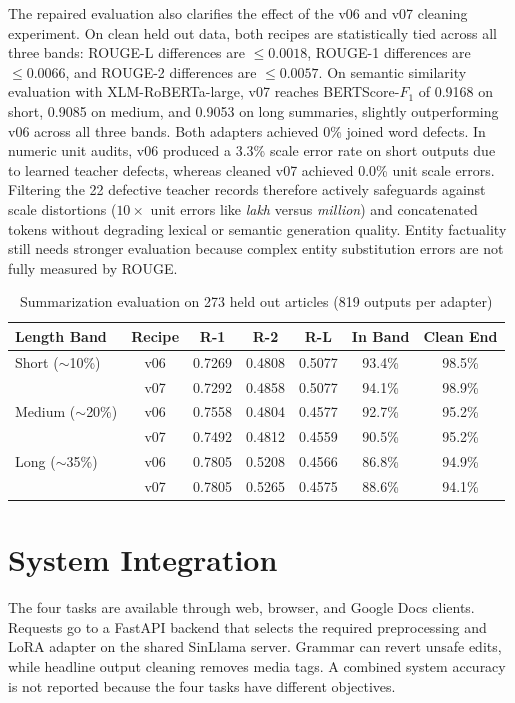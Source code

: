 \documentclass[a4paper,conference]{IEEEtran}
\begin{document}
The repaired evaluation also clarifies the effect of the v06 and v07 cleaning
experiment. On clean held out data, both recipes are statistically tied across all
three bands: ROUGE-L differences are $\le 0.0018$, ROUGE-1 differences are $\le 0.0066$,
and ROUGE-2 differences are $\le 0.0057$. On semantic similarity evaluation with
XLM-RoBERTa-large, v07 reaches BERTScore-$F_1$ of 0.9168 on short, 0.9085 on medium, and
0.9053 on long summaries, slightly outperforming v06 across all three bands. Both
adapters achieved 0\% joined word defects. In numeric unit audits, v06 produced a 3.3\%
scale error rate on short outputs due to learned teacher defects, whereas cleaned v07
achieved 0.0\% unit scale errors. Filtering the 22 defective teacher records therefore
actively safeguards against scale distortions ($10\times$ unit errors like
\textit{lakh} versus \textit{million}) and concatenated tokens without degrading lexical
or semantic generation quality. Entity factuality still needs stronger evaluation
because complex entity substitution errors are not fully measured by ROUGE.

\begin{table}[!b]
\caption{Summarization evaluation on 273 held out articles (819 outputs per adapter)}
\label{tab:summaryfrozen}
\centering
\footnotesize
\setlength{\tabcolsep}{2.2pt}
\renewcommand{\arraystretch}{1.04}
\begin{tabular}{|l|c|ccc|c|c|}
\hline
\textbf{Length Band} & \textbf{Recipe} & \textbf{R-1} & \textbf{R-2} & \textbf{R-L} & \textbf{In Band} & \textbf{Clean End} \\
\hline
Short ($\sim$10\%)  & v06 & 0.7269 & 0.4808 & 0.5077 & 93.4\% & 98.5\% \\
                    & v07 & 0.7292 & 0.4858 & 0.5077 & 94.1\% & 98.9\% \\
\hline
Medium ($\sim$20\%) & v06 & 0.7558 & 0.4804 & 0.4577 & 92.7\% & 95.2\% \\
                    & v07 & 0.7492 & 0.4812 & 0.4559 & 90.5\% & 95.2\% \\
\hline
Long ($\sim$35\%)   & v06 & 0.7805 & 0.5208 & 0.4566 & 86.8\% & 94.9\% \\
                    & v07 & 0.7805 & 0.5265 & 0.4575 & 88.6\% & 94.1\% \\
\hline
\end{tabular}
\end{table}

\section{System Integration}
The four tasks are available through web, browser, and Google Docs clients.
Requests go to a FastAPI backend that selects the required preprocessing and
LoRA adapter on the shared SinLlama server. Grammar can revert unsafe edits,
while headline output cleaning removes media tags. A combined system accuracy
is not reported because the four tasks have different objectives.
\end{document}
